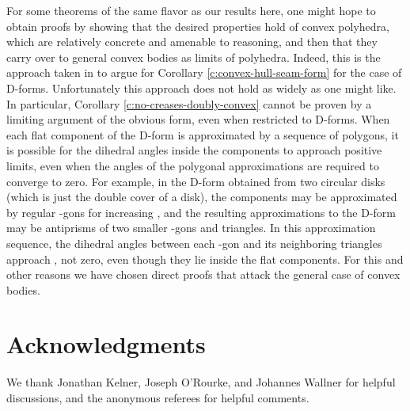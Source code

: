 \documentclass{article}
\begin{document}
For some theorems of the same flavor as our results here, one might
hope to obtain proofs by showing that the desired properties hold of
convex polyhedra, which are relatively concrete and amenable to
reasoning, and then that they carry over to general convex bodies as
limits of polyhedra.  Indeed, this is the approach taken in
\cite{GFALOP} to argue for Corollary \ref{c:convex-hull-seam-form} for
the case of D-forms.
Unfortunately this approach does not hold as widely as one might like.
In particular, Corollary \ref{c:no-creases-doubly-convex} cannot be
proven by a limiting argument of the obvious form, even when
restricted to D-forms.  When each
flat component of the D-form is approximated by a sequence of
polygons, it is possible for the dihedral angles inside the
components to approach positive limits, even when the angles of the polygonal
approximations are required to converge to zero.  For example, in
the D-form obtained from two circular disks (which is just the double
cover of a disk), the components may be approximated by regular -gons
for increasing , and the resulting approximations to the D-form may
be antiprisms of two smaller -gons and  triangles.  In this
approximation sequence, the dihedral angles between each -gon and
its  neighboring triangles approach , not zero, even though
they lie inside the flat components.  For this and other reasons we
have chosen direct proofs that attack the general case of convex bodies.



\section{Acknowledgments}
We thank Jonathan Kelner, Joseph O'Rourke, and Johannes Wallner for
helpful discussions, and the anonymous referees for helpful comments.



\end{document}
